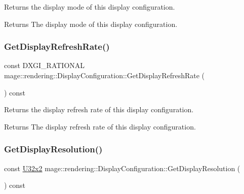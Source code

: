 Returns the display mode of this display configuration.

\begin{DoxyReturn}{Returns}
The display mode of this display configuration. 
\end{DoxyReturn}
\mbox{\label{classmage_1_1rendering_1_1_display_configuration_ae100fc84cd1900e302fb784f429a06b7}} 
\subsubsection{\texorpdfstring{Get\+Display\+Refresh\+Rate()}{GetDisplayRefreshRate()}}
{\footnotesize\ttfamily const D\+X\+G\+I\+\_\+\+R\+A\+T\+I\+O\+N\+AL mage\+::rendering\+::\+Display\+Configuration\+::\+Get\+Display\+Refresh\+Rate (\begin{DoxyParamCaption}{ }\end{DoxyParamCaption}) const\hspace{0.3cm}{\ttfamily [noexcept]}}

Returns the display refresh rate of this display configuration.

\begin{DoxyReturn}{Returns}
The display refresh rate of this display configuration. 
\end{DoxyReturn}
\mbox{\label{classmage_1_1rendering_1_1_display_configuration_a1394352b2a3f80fb1cc24d96f744ae3c}} 
\subsubsection{\texorpdfstring{Get\+Display\+Resolution()}{GetDisplayResolution()}}
{\footnotesize\ttfamily const \mbox{\hyperlink{namespacemage_a31f2bb52b5080e706e1c13de07c0a249}{U32x2}} mage\+::rendering\+::\+Display\+Configuration\+::\+Get\+Display\+Resolution (\begin{DoxyParamCaption}{ }\end{DoxyParamCaption}) const\hspace{0.3cm}{\ttfamily [noexcept]}}

